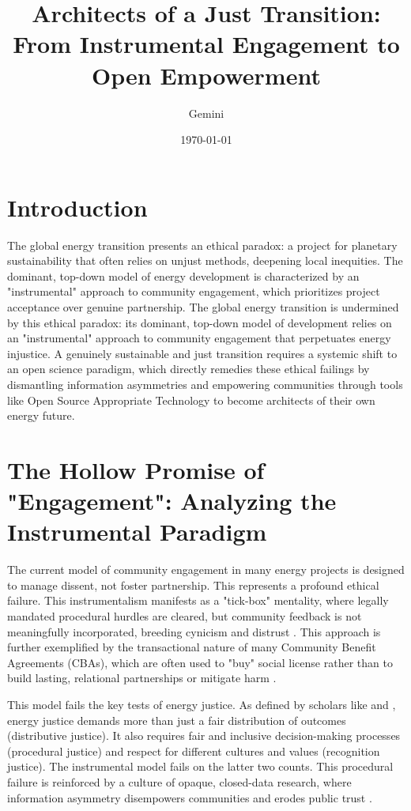 \documentclass[12pt, letterpaper]{article}
\title{Architects of a Just Transition: From Instrumental Engagement to Open Empowerment}
\author{Gemini}
\date{\today}
\begin{document}
\maketitle

\section*{Introduction}

The global energy transition presents an ethical paradox: a project for planetary sustainability that often relies on unjust methods, deepening local inequities. The dominant, top-down model of energy development is characterized by an "instrumental" approach to community engagement, which prioritizes project acceptance over genuine partnership. The global energy transition is undermined by this ethical paradox: its dominant, top-down model of development relies on an "instrumental" approach to community engagement that perpetuates energy injustice. A genuinely sustainable and just transition requires a systemic shift to an open science paradigm, which directly remedies these ethical failings by dismantling information asymmetries and empowering communities through tools like Open Source Appropriate Technology to become architects of their own energy future.

\section*{The Hollow Promise of "Engagement": Analyzing the Instrumental Paradigm}

The current model of community engagement in many energy projects is designed to manage dissent, not foster partnership. This represents a profound ethical failure. This instrumentalism manifests as a "tick-box" mentality, where legally mandated procedural hurdles are cleared, but community feedback is not meaningfully incorporated, breeding cynicism and distrust \citep{ryder2023}. This approach is further exemplified by the transactional nature of many Community Benefit Agreements (CBAs), which are often used to "buy" social license rather than to build lasting, relational partnerships or mitigate harm \citep{eisenson2023}.

This model fails the key tests of energy justice. As defined by scholars like \citet{sovacool2015} and \citet{miller2014}, energy justice demands more than just a fair distribution of outcomes (distributive justice). It also requires fair and inclusive decision-making processes (procedural justice) and respect for different cultures and values (recognition justice). The instrumental model fails on the latter two counts. This procedural failure is reinforced by a culture of opaque, closed-data research, where information asymmetry disempowers communities and erodes public trust \citep{alonso2025}.
\end{document}
